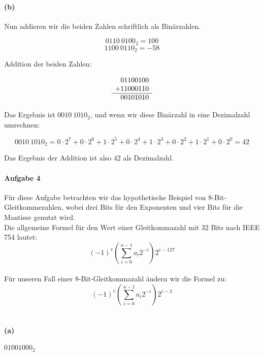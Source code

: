 \documentclass[12pt, letterpaper]{article}
\begin{document}
\paragraph{(b)}

\noindent Nun addieren wir die beiden Zahlen schriftlich als Binärzahlen.

\[
0110\ 0100_2 = 100
\]
\[
1100\ 0110_2 = -58
\]

\noindent Addition der beiden Zahlen:

\[
\begin{array}{c@{}c@{}c@{}c@{}c@{}c@{}c@{}c@{}c}
  & 0 & 1 & 1 & 0 & 0 & 1 & 0 & 0 \\
+ & 1 & 1 & 0 & 0 & 0 & 1 & 1 & 0 \\
\hline
  & 0 & 0 & 1 & 0 & 1 & 0 & 1 & 0 \\
\end{array}
\]

\noindent Das Ergebnis ist \(0010\ 1010_2\), und wenn wir diese Binärzahl in eine Dezimalzahl umrechnen:

\[
0010\ 1010_2 = 0 \cdot 2^7 + 0 \cdot 2^6 + 1 \cdot 2^5 + 0 \cdot 2^4 + 1 \cdot 2^3 + 0 \cdot 2^2 + 1 \cdot 2^1 + 0 \cdot 2^0 = 42
\]

\noindent Das Ergebnis der Addition ist also \(42\) als Dezimalzahl.

\paragraph{Aufgabe 4}

Für diese Aufgabe betrachten wir das hypothetische Beispiel von 8-Bit-Gleitkommezahlen, wobei drei Bits für den Exponenten und vier Bits für die Mantisse genutzt wird.\\ Die allgemeine Formel für den Wert einer Gleitkommazahl mit 32 Bits nach IEEE 754 lautet:\\

$$(-1)^v \left( \sum_{i=0}^{n-1} a_i 2^{-i} \right) 2^{\overline{e} - 127}$$\\

\noindent Für unseren Fall einer 8-Bit-Gleitkommazahl ändern wir die Formel zu:\\

$$(-1)^v \left( \sum_{i=0}^{n-1} a_i 2^{-i} \right) 2^{\overline{e} - 3}$$\\

\paragraph{(a)} $01001000_2$ \newline
\end{document}
